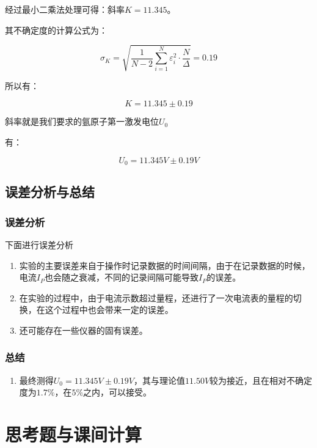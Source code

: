 \documentclass[a4paper,UTF8]{ctexart}
\begin{document}
经过最小二乘法处理可得：斜率$K=11.345$。

其不确定度的计算公式为：

\begin{equation}
    \sigma_K = \sqrt{\frac{1}{N-2} \sum_{i=1}^{N}\varepsilon_i^{2} \cdot \frac{N}{\Delta}} = 0.19
\end{equation}

所以有：

\begin{equation}
    K = 11.345 \pm 0.19
\end{equation}

斜率就是我们要求的氩原子第一激发电位$U_0$

有：

\begin{equation}
    U_0 = 11.345 V \pm 0.19V
\end{equation}

\subsection{误差分析与总结}

\subsubsection{误差分析}

下面进行误差分析

\begin{enumerate}
    \item 实验的主要误差来自于操作时记录数据的时间间隔，由于在记录数据的时候，电流$I_P$也会随之衰减，不同的记录间隔可能导致$I_P$的误差。
    \item 在实验的过程中，由于电流示数超过量程，还进行了一次电流表的量程的切换，在这个过程中也会带来一定的误差。
    \item 还可能存在一些仪器的固有误差。
\end{enumerate}

\subsubsection{总结}

\begin{enumerate}
    \item 最终测得$U_0 = 11.345 V \pm 0.19V$，其与理论值$11.50V$较为接近，且在相对不确定度为$1.7\%$，在$5\%$之内，可以接受。
\end{enumerate}

\section{思考题与课间计算}
\end{document}
